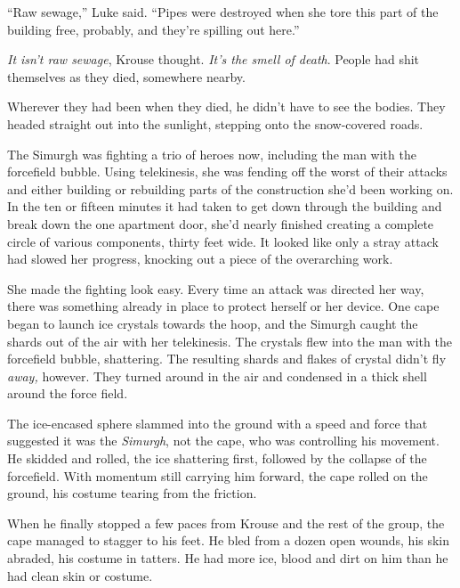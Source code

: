 ``Raw sewage,'' Luke said.  ``Pipes were destroyed when she tore this part of the building free, probably, and they're spilling out here.''



\emph{It isn't raw sewage}, Krouse thought.  \emph{It's the smell of death}.  People had shit themselves as they died, somewhere nearby.



Wherever they had been when they died, he didn't have to see the bodies.  They headed straight out into the sunlight, stepping onto the snow-covered roads.



The Simurgh was fighting a trio of heroes now, including the man with the forcefield bubble.  Using telekinesis, she was fending off the worst of their attacks and either building or rebuilding parts of the construction she'd been working on.  In the ten or fifteen minutes it had taken to get down through the building and break down the one apartment door, she'd nearly finished creating a complete circle of various components, thirty feet wide.  It looked like only a stray attack had slowed her progress, knocking out a piece of the overarching work.



She made the fighting look easy.  Every time an attack was directed her way, there was something already in place to protect herself or her device.  One cape began to launch ice crystals towards the hoop, and the Simurgh caught the shards out of the air with her telekinesis.  The crystals flew into the man with the forcefield bubble, shattering.  The resulting shards and flakes of crystal didn't fly \emph{away,} however.  They turned around in the air and condensed in a thick shell around the force field.



The ice-encased sphere slammed into the ground with a speed and force that suggested it was the \emph{Simurgh}, not the cape, who was controlling his movement.  He skidded and rolled, the ice shattering first, followed by the collapse of the forcefield.  With momentum still carrying him forward, the cape rolled on the ground, his costume tearing from the friction.



When he finally stopped a few paces from Krouse and the rest of the group, the cape managed to stagger to his feet.  He bled from a dozen open wounds, his skin abraded, his costume in tatters.  He had more ice, blood and dirt on him than he had clean skin or costume.



